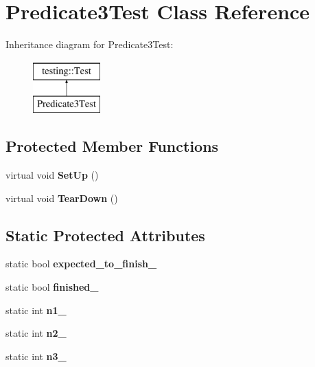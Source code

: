 \hypertarget{class_predicate3_test}{}\section{Predicate3\+Test Class Reference}
\label{class_predicate3_test}
Inheritance diagram for Predicate3\+Test\+:\begin{figure}[H]
\begin{center}
\leavevmode
\includegraphics[height=2.000000cm]{class_predicate3_test}
\end{center}
\end{figure}
\subsection*{Protected Member Functions}
\begin{DoxyCompactItemize}
\item 
\mbox{\label{class_predicate3_test_a92aad9566e0737b6739d1db14e7912be}} 
virtual void {\bfseries Set\+Up} ()
\item 
\mbox{\label{class_predicate3_test_aa4dc395bded849b6e5175566d791aba7}} 
virtual void {\bfseries Tear\+Down} ()
\end{DoxyCompactItemize}
\subsection*{Static Protected Attributes}
\begin{DoxyCompactItemize}
\item 
\mbox{\label{class_predicate3_test_a42c11555410ee89bf6e59d39336a212c}} 
static bool {\bfseries expected\+\_\+to\+\_\+finish\+\_\+}
\item 
\mbox{\label{class_predicate3_test_aa2ef0fa6aed09d872fb9ae36961b49eb}} 
static bool {\bfseries finished\+\_\+}
\item 
\mbox{\label{class_predicate3_test_ac232320a93f0c1e09886148a3e1929a5}} 
static int {\bfseries n1\+\_\+}
\item 
\mbox{\label{class_predicate3_test_a11049ef16bcaadc8262faf7349c7676e}} 
static int {\bfseries n2\+\_\+}
\item 
\mbox{\label{class_predicate3_test_afc1df6b079ffe22b87479b161d2ad2f7}} 
static int {\bfseries n3\+\_\+}
\end{DoxyCompactItemize}
